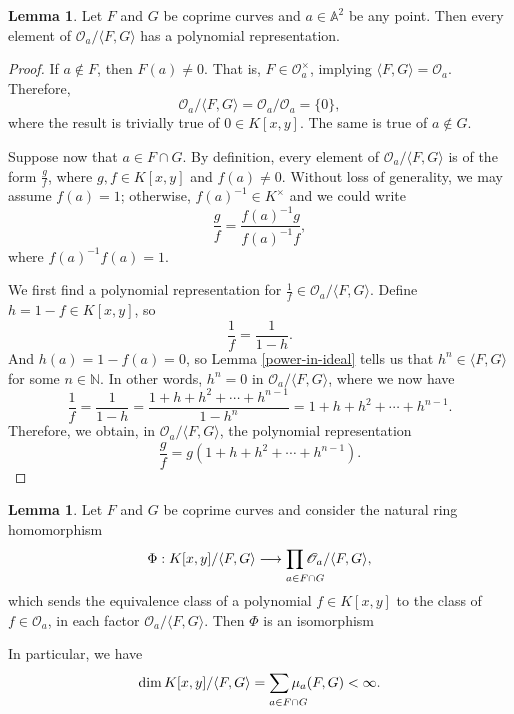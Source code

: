 \documentclass[12pt]{article}
\makeatletter
\newenvironment{fullbox}{\begin{lrbox}{\savefullbox}\begin{minipage}{\dimexpr\textwidth-2\fboxsep\relax}}{\end{minipage}\end{lrbox}\begin{center}\framebox[\textwidth]{\usebox{\savefullbox}}\end{center}}
\theoremstyle{definition}
\newtheorem{lemma}[theorem]{Lemma}
\newenvironment{blemma}{\begin{fullbox}\begin{lemma}}{\end{lemma}\end{fullbox}}
\newcommand{\N}{\mathbb{N}}
\newcommand{\<}{\langle}
\renewcommand{\>}{\rangle}
\newcommand{\A}{\mathbb{A}}
\renewcommand{\O}{\mathscr{O}}
\newcommand{\longlimit}[2]{
    {
        \def\arraystretch{0}
        \begin{array}[t]{@{}l@{}}
            \displaystyle{#2} \\[8.5pt] \scriptstyle{#1}
        \end{array}
    }
}
\newcommand{\longprod}[2]{\longlimit{#1}{\prod #2}}
\newcommand{\longsum}[2]{\longlimit{#1}{\sum #2}}
\makeatother
\begin{document}
\begin{blemma}\label{poly-rep}
    Let $F$ and $G$ be coprime curves and $a \in \A^2$ be any point. Then every element of $\O_a / \<F, G\>$ has a polynomial representation.
\end{blemma}

\begin{proof}
    If $a \notin F$, then $F(a) \ne 0$. That is, $F \in \O_a^\times$, implying $\<F, G\> = \O_a$. Therefore,
    \[
        \O_a/\<F, G\> = \O_a/\O_a = \{0\},
    \]
    where the result is trivially true of $0 \in K[x, y]$. The same is true of $a \notin G$.

    Suppose now that $a \in F \cap G$. By definition, every element of $\O_a / \<F, G\>$ is of the form $\frac{g}{f}$, where $g, f \in K[x, y]$ and $f(a) \ne 0$. Without loss of generality, we may assume $f(a) = 1$; otherwise, $f(a)^{-1} \in K^\times$ and we could write
    \[
        \frac{g}{f} = \frac{f(a)^{-1} g}{f(a)^{-1} f},
    \]
    where $f(a)^{-1} f(a) = 1$.

    We first find a polynomial representation for $\frac{1}{f} \in \O_a / \<F, G\>$. Define $h = 1 - f \in K[x, y]$, so
    \[
        \frac{1}{f} 
            = \frac{1}{1 - h}.
    \]
    And $h(a) = 1 - f(a) = 0$, so Lemma \ref{power-in-ideal} tells us that $h^n \in \<F, G\>$ for some $n \in \N$. In other words, $h^n = 0$ in $\O_a / \<F, G\>$, where we now have
    \[
        \frac{1}{f}
            = \frac{1}{1 - h}
            = \frac{1 + h + h^2 + \cdots + h^{n-1}}{1 - h^n}
            = 1 + h + h^2 + \cdots + h^{n-1}.
    \]
    Therefore, we obtain, in $\O_a / \<F, G\>$, the polynomial representation
    \[
        \frac{g}{f} = g(1 + h + h^2 + \cdots + h^{n-1}).
    \]


\end{proof}





\begin{blemma}\label{KqFG-isom}
    Let $F$ and $G$ be coprime curves and consider the natural ring homomorphism
    \[
        \Phi : K[x, y] / \<F, G\> \longrightarrow \longprod{a \in F \cap G}{\O_a / \<F, G\>},
    \]
    which sends the equivalence class of a polynomial $f \in K[x, y]$ to the class of $f \in \O_a$, in each factor $\O_a / \<F, G\>$. Then $\Phi$ is an isomorphism
    
    In particular, we have
    \[
        \dim K[x, y] / \<F, G\> = \longsum{a \in F \cap G}{\mu_a(F, G)} < \infty.
    \]
\end{blemma}
\end{document}

